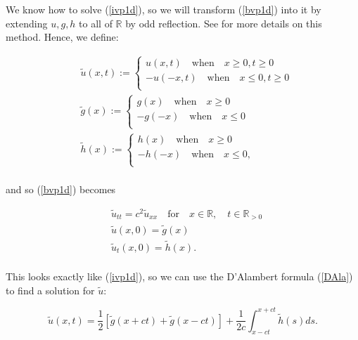 \documentclass[a4paper, 12pt]{article}
\numberwithin{equation}{section}
\begin{document}
We know how to solve (\ref{ivp1d}), so we will transform (\ref{bvp1d}) into it
by extending $u,g,h$ to all of $\mathbb{R}$ by odd reflection. See \cite{Ev} for
more details on this method. Hence, we define:

\begin{equation*}
    \begin{aligned}
        &\tilde{u}(x,t):=
        \begin{cases}
            u(x,t) \quad \textrm{when} \quad x \ge 0, t \ge 0\\
            -u(-x,t) \quad \textrm{when} \quad x \le 0, t \ge 0\\
        \end{cases}
        \\
        &\tilde{g}(x):=
        \begin{cases}
            g(x) \quad \textrm{when} \quad x \ge 0\\
            -g(-x) \quad \textrm{when} \quad x \le 0\\
        \end{cases}
        \\
        &\tilde{h}(x):=
        \begin{cases}
            h(x) \quad \textrm{when} \quad x \ge 0\\
            -h(-x) \quad \textrm{when} \quad x \le 0,\\
        \end{cases}
    \end{aligned}
\end{equation*}
\\

and so (\ref{bvp1d}) becomes 

\begin{align*}
    &\tilde{u}_{tt}=c^2\tilde{u}_{xx} \quad \textrm {for} \quad x \in \mathbb{R}, \quad t \in \mathbb{R}_{>0} \\
    &\tilde{u}(x,0)=\tilde{g}(x)\\
    &\tilde{u}_t(x,0)=\tilde{h}(x).\\
\end{align*}

This looks exactly like (\ref{ivp1d}), so we can use the D'Alambert formula
(\ref{DAla}) to find a solution for $\tilde{u}$:

\begin{equation*}
    \tilde{u}(x,t)=\frac{1}{2}\left[\tilde{g}(x+ct)+\tilde{g}(x-ct)\right]+\frac{1}{2c}\int^{x+ct}_{x-ct}\tilde{h}(s)ds.
\end{equation*}
\end{document}

